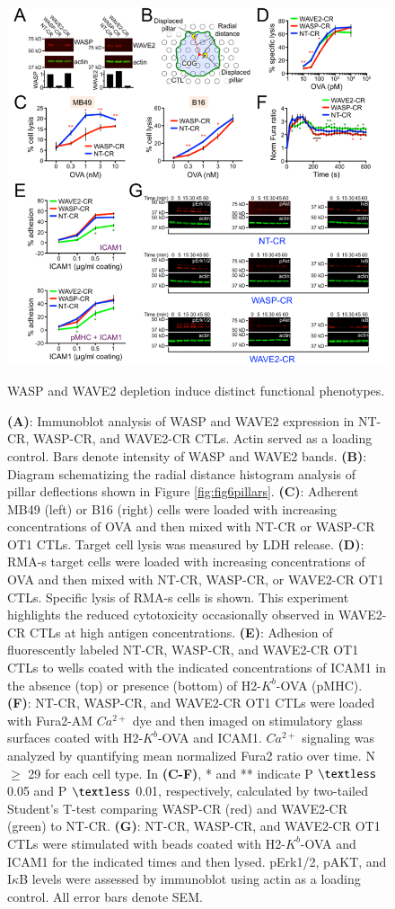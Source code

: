 \begin{figure}[htbp]
	\centering
	\includegraphics[width=\textwidth]{../figures/chapter2/fig6supp.png}
	\caption{WASP and WAVE2 depletion induce distinct functional phenotypes.}
	\caption*{\textbf{(A)}: Immunoblot analysis of WASP and WAVE2 expression in NT-CR, WASP-CR, and WAVE2-CR CTLs. Actin served as a loading control. Bars denote intensity of WASP and WAVE2 bands. \textbf{(B)}: Diagram schematizing the radial distance histogram analysis of pillar deflections shown in Figure \ref{fig:fig6pillars}. \textbf{(C)}: Adherent MB49 (left) or B16 (right) cells were loaded with increasing concentrations of OVA and then mixed with NT-CR or WASP-CR OT1 CTLs. Target cell lysis was measured by LDH release. \textbf{(D)}: RMA-s target cells were loaded with increasing concentrations of OVA and then mixed with NT-CR, WASP-CR, or WAVE2-CR OT1 CTLs. Specific lysis of RMA-s cells is shown. This experiment highlights the reduced cytotoxicity occasionally observed in WAVE2-CR CTLs at high antigen concentrations. \textbf{(E)}: Adhesion of fluorescently labeled NT-CR, WASP-CR, and WAVE2-CR OT1 CTLs to wells coated with the indicated concentrations of ICAM1 in the absence (top) or presence (bottom) of H2-$K^{b}$-OVA (pMHC). \textbf{(F)}: NT-CR, WASP-CR, and WAVE2-CR OT1 CTLs were loaded with Fura2-AM $Ca^{2+}$ dye and then imaged on stimulatory glass surfaces coated with H2-$K^{b}$-OVA and ICAM1. $Ca^{2+}$ signaling was analyzed by quantifying mean normalized Fura2 ratio over time. N $\geq$ 29 for each cell type. In \textbf{(C-F)}, * and ** indicate P $\textless$ 0.05 and P $\textless$ 0.01, respectively, calculated by two-tailed Student’s T-test comparing WASP-CR (red) and WAVE2-CR (green) to NT-CR. \textbf{(G)}: NT-CR, WASP-CR, and WAVE2-CR OT1 CTLs were stimulated with beads coated with H2-$K^{b}$-OVA and ICAM1 for the indicated times and then lysed. pErk1/2, pAKT, and I$\kappa$B levels were assessed by immunoblot using actin as a loading control. All error bars denote SEM.}
	\label{fig:fig6supp}
\end{figure}

